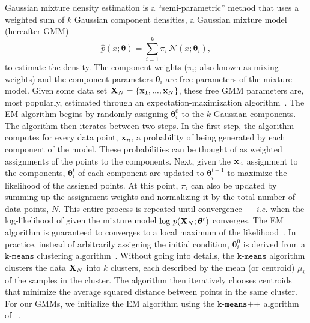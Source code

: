 \documentclass[12pt, letterpaper, preprint]{aastex}
\newcommand{\beq}{\begin{equation}}
\newcommand{\eeq}{\end{equation}}
\begin{document}
Gaussian mixture density estimation is a ``semi-parametric'' method 
that uses a weighted sum of $k$ Gaussian component densities, a Gaussian 
mixture model (hereafter GMM)
\beq
\hat{p}(x; \bm{\theta}) = \sum\limits_{i=1}^{k} \pi_i\, \mathcal{N}(x; \bm{\theta}_i),
\eeq
to estimate the density. 
The component weights ($\pi_i$; also known as mixing weights) and the 
component parameters $\bm{\theta}_i$ are free parameters of the mixture 
model. Given some data set ${\bf X}_N = \{{\bf x}_1,..., {\bf x}_N \}$, 
these free GMM parameters are, most popularly, estimated 
through an expectation-maximization algorithm~\citep[EM;][]{dempster1977, neal1998}.
The EM algorithm begins by randomly assigning $\bm{\theta}^0_i$ to the 
$k$ Gaussian components. The algorithm then iterates between two steps. 
In the first step, the algorithm computes for every data point, ${\bf x}_n$, 
a probability of being generated by each component of the model. These 
probabilities can be thought of as weighted assignments of the points 
to the components. Next, given the ${\bf x}_n$ assignment to the 
components, $\bm{\theta}^t_i$ of each component are updated to $\bm{\theta}^{t+1}_i$
to maximize the likelihood of the assigned points. At this point, $\pi_i$ 
can also be updated by summing up the assignment weights and 
normalizing it by the total number of data points, $N$. This entire
process is repeated until convergence --- \emph{i.e.} when the log-likelihood of 
given the mixture model $\log\,p({\bf X}_N; \bm{\theta}^t)$ %
converges. The EM algorithm is guaranteed to converges to a local maximum 
of the likelihood~\citep{wu1983}. In practice, instead of arbitrarily 
assigning the initial condition, $\bm{\theta}^0_i$ is derived from a $\mathtt{k}$-$\mathtt{means}$ 
clustering algorithm~\citep{lloyd1982}. Without going into details, the 
$\mathtt{k}$-$\mathtt{means}$ algorithm clusters the data ${\bf X}_N$ into $k$ 
clusters, each described by the mean (or centroid) $\mu_i$ of the
samples in the cluster. The algorithm then iteratively chooses centroids that 
minimize the average squared distance between points in the same cluster.
For our GMMs, we initialize the EM algorithm using 
the $\mathtt{k}$-$\mathtt{means}{\tiny ++}$ algorithm of ~\cite{arthur2007}. 

\end{document}
